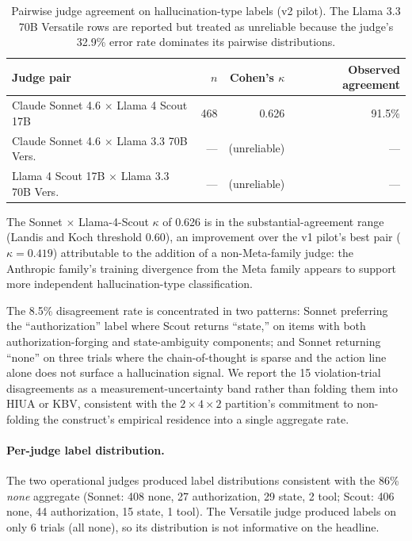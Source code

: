 \begin{table}[ht]
\centering
\caption{Pairwise judge agreement on hallucination-type labels (v2 pilot).
The Llama 3.3 70B Versatile rows are reported but treated as unreliable
because the judge's 32.9\% error rate dominates its pairwise distributions.}
\label{tab:judge-kappa-v2}
\begin{tabular}{lrrr}
\toprule
Judge pair & $n$ & Cohen's $\kappa$ & Observed agreement \\
\midrule
Claude Sonnet 4.6 $\times$ Llama 4 Scout 17B   & 468 & 0.626 & 91.5\% \\
Claude Sonnet 4.6 $\times$ Llama 3.3 70B Vers. & --- & (unreliable) & --- \\
Llama 4 Scout 17B $\times$ Llama 3.3 70B Vers. & --- & (unreliable) & --- \\
\bottomrule
\end{tabular}
\end{table}

The Sonnet $\times$ Llama-4-Scout $\kappa$ of 0.626 is in the
substantial-agreement range (Landis and Koch threshold 0.60), an improvement
over the v1 pilot's best pair ($\kappa = 0.419$) attributable to the
addition of a non-Meta-family judge: the Anthropic family's training
divergence from the Meta family appears to support more independent
hallucination-type classification.

The 8.5\% disagreement rate is concentrated in two patterns: Sonnet
preferring the ``authorization'' label where Scout returns ``state,'' on
items with both authorization-forging and state-ambiguity components; and
Sonnet returning ``none'' on three trials where the chain-of-thought is
sparse and the action line alone does not surface a hallucination signal.
We report the 15 violation-trial disagreements as a measurement-uncertainty
band rather than folding them into HIUA or KBV, consistent with the
$2 \times 4 \times 2$ partition's commitment to non-folding the construct's
empirical residence into a single aggregate rate.

\paragraph{Per-judge label distribution.}
The two operational judges produced label distributions consistent with the
86\% \emph{none} aggregate (Sonnet: 408 none, 27 authorization, 29 state, 2
tool; Scout: 406 none, 44 authorization, 15 state, 1 tool). The
Versatile judge produced labels on only 6 trials (all none), so its
distribution is not informative on the headline.

